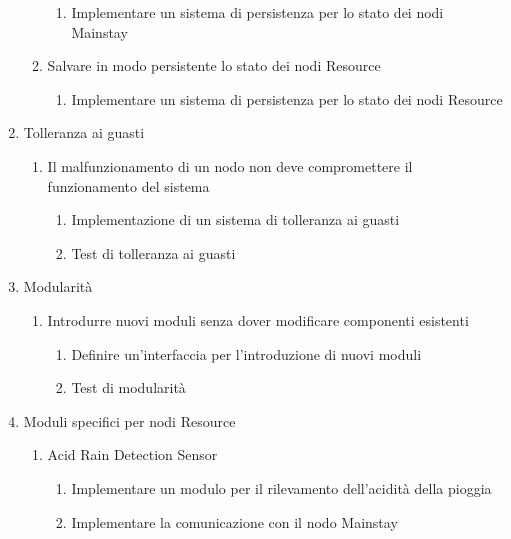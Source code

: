 \begin{enumerate}
\begin{enumerate}
\begin{enumerate}
                        \item Implementare un sistema di persistenza per lo stato dei nodi Mainstay
                    \end{enumerate}
              \item Salvare in modo persistente lo stato dei nodi Resource
                    \begin{enumerate}
                        \item Implementare un sistema di persistenza per lo stato dei nodi Resource
                    \end{enumerate}
          \end{enumerate}
    \item Tolleranza ai guasti
          \begin{enumerate}
              \item Il malfunzionamento di un nodo non deve compromettere il funzionamento del sistema
                    \begin{enumerate}
                        \item Implementazione di un sistema di tolleranza ai guasti
                        \item Test di tolleranza ai guasti
                    \end{enumerate}
          \end{enumerate}
    \item Modularità
          \begin{enumerate}
              \item Introdurre nuovi moduli senza dover modificare componenti esistenti
                    \begin{enumerate}
                        \item Definire un'interfaccia per l'introduzione di nuovi moduli
                        \item Test di modularità
                    \end{enumerate}
          \end{enumerate}
    \item Moduli specifici per nodi Resource
          \begin{enumerate}
              \item Acid Rain Detection Sensor
                    \begin{enumerate}
                        \item Implementare un modulo per il rilevamento dell'acidità della pioggia
                        \item Implementare la comunicazione con il nodo Mainstay

\end{enumerate}
\end{enumerate}
\end{enumerate}
